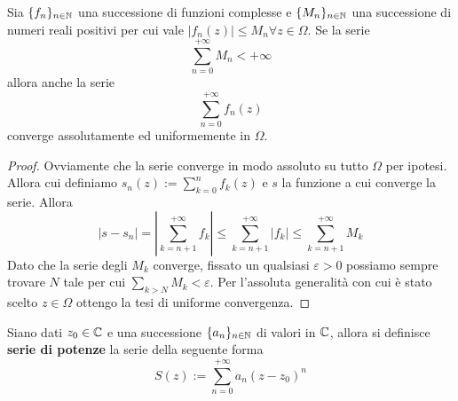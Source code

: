 \begin{theorem}
	\label{thr:m-test-weierstrass} Sia $\{f_n\}_{n\in\mathbb{N}}$ una successione di funzioni complesse e $\{M_n\}_{n\in\mathbb{N}}$ una successione di numeri reali positivi per cui vale $|f_n(z)| \le M_n \forall z\in \Omega$. Se la serie 
	\begin{equation*}
		\sum_{n=0}^{+\infty} M_n < +\infty
	\end{equation*} 
	allora anche la serie 
	\begin{equation*}
		\sum_{n=0}^{+\infty} f_n(z)
	\end{equation*}
	converge assolutamente ed uniformemente in $\Omega$.
\end{theorem}
\begin{proof}
	Ovviamente che la serie converge in modo assoluto su tutto $\Omega$ per ipotesi. Allora cui definiamo $s_n(z) := \sum_{k=0}^n f_k(z)$ e $s$ la funzione a cui converge la serie. Allora
	\begin{equation*}
		|s - s_n| = \left|\sum_{k=n+1}^{+\infty} f_k\right| \le \sum_{k=n+1}^{+\infty} \left|f_k\right| \le \sum_{k=n+1}^{+\infty} M_k
	\end{equation*}
	Dato che la serie degli $M_k$ converge, fissato un qualsiasi $\varepsilon > 0$ possiamo sempre trovare $N$ tale per cui $\sum_{k>N} M_k < \varepsilon$. Per l'assoluta generalità con cui è stato scelto $z \in \Omega$ ottengo la tesi di uniforme convergenza. 
\end{proof}

\begin{definition}
	\label{defn:serie-di-potenze}
	Siano dati $z_0 \in \mathbb{C}$ e una successione $\{a_n\}_{n\in \mathbb{N}}$ di valori in $\mathbb{C}$, allora si definisce \textbf{serie di potenze} la serie della seguente forma
	\begin{equation*}
		S(z) := \sum_{n=0}^{+\infty} a_n(z-z_0)^n
	\end{equation*}
\end{definition}

